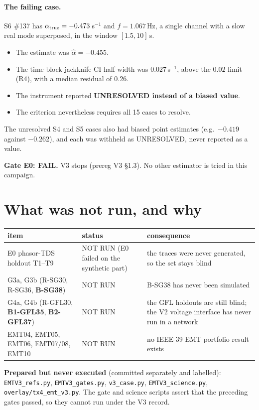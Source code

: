 \documentclass[10pt,a4paper]{article}
\newcommand{\sinv}{\,s$^{-1}$}
\newcommand{\f}[1]{\nolinkurl{#1}}
\begin{document}
\paragraph{The failing case.} S6 \#137 has $\alpha_{\rm true}=-0.473$\sinv{} and
$f=1.067$\,Hz, a single channel with a slow real mode superposed, in the window
$[1.5,10]$\,s.
\begin{itemize}
\item The estimate was $\hat\alpha=-0.455$.
\item The time-block jackknife CI half-width was $0.027$\sinv, above the
  $0.02$ limit (R4), with a median residual of 0.26.
\item The instrument reported \textbf{UNRESOLVED instead of a biased value}.
\item The criterion nevertheless requires all 15 cases to resolve.
\end{itemize}
The unresolved S4 and S5 cases also had biased point estimates (e.g.\
$-0.419$ against $-0.262$), and each was withheld as UNRESOLVED, never reported
as a value.

\medskip
\noindent\textbf{Gate E0: FAIL.} V3 stops (prereg V3 \S1.3). No other estimator
is tried in this campaign.

\section{What was not run, and why}

\noindent\begin{tabularx}{\linewidth}{@{}L{5cm}L{3.8cm}Y@{}}
\toprule
item & status & consequence\\
\midrule
E0 phasor-TDS holdout T1--T9 & NOT RUN (E0 failed on the synthetic part) & the traces were never generated, so the set stays blind\\
G3a, G3b (R-SG30, R-SG36, \textbf{B-SG38}) & NOT RUN & B-SG38 has never been simulated\\
G4a, G4b (R-GFL30, \textbf{B1-GFL35}, \textbf{B2-GFL37}) & NOT RUN & the GFL holdouts are still blind; the V2 voltage interface has never run in a network\\
EMT04, EMT05, EMT06, EMT07/08, EMT10 & NOT RUN & no IEEE-39 EMT portfolio result exists\\
\bottomrule
\end{tabularx}

\medskip
\noindent\textbf{Prepared but never executed} (committed separately and labelled):
\f{EMTV3_refs.py}, \f{EMTV3_gates.py}, \f{v3_case.py}, \f{EMTV3_science.py},
\f{overlay/tx4_emt_v3.py}. The gate and science scripts assert that the
preceding gates passed, so they cannot run under the V3 record.
\end{document}
